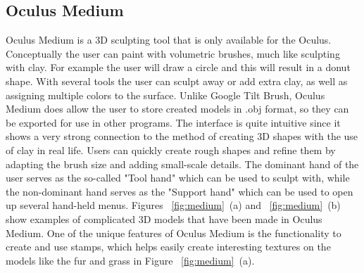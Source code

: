 \subsection{Oculus Medium}
Oculus Medium is a 3D sculpting tool that is only available for the Oculus. Conceptually the user can paint with volumetric brushes, much like sculpting with clay. For example the user will draw a circle and this will result in a donut shape. With several tools the user can sculpt away or add extra clay, as well as assigning multiple colors to the surface.
Unlike Google Tilt Brush, Oculus Medium does allow the user to store created models in .obj format, so they can be exported for use in other programs. The interface is quite intuitive since it shows a very strong connection to the method of creating 3D shapes with the use of clay in real life. Users can quickly create rough shapes and refine them by adapting the brush size and adding small-scale details. The dominant hand of the user serves as the so-called "Tool hand" which can be used to sculpt with, while the non-dominant hand serves as the "Support hand" which can be used to open up several hand-held menus. Figures ~\ref{fig:medium}~(a) and ~\ref{fig:medium}~(b) show examples of complicated 3D models that have been made in Oculus Medium. One of the unique features of Oculus Medium is the functionality to create and use stamps, which helps easily create interesting textures on the models like the fur and grass in Figure ~\ref{fig:medium}~(a).


